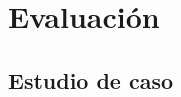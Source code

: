 \documentclass[9pt]{beamer}
\begin{document}
        

    \section{Evaluación}
    \subsection{Estudio de caso}

       

\end{document}
